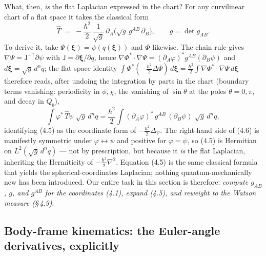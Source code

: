 What, then, \emph{is} the flat Laplacian expressed in the chart? For any curvilinear chart of a flat space it takes the classical form
\begin{equation}
\boxed{\;\hat T \;=\; -\frac{\hbar^{2}}{2}\,\frac{1}{\sqrt{g}}\,\partial_A\!\bigl(\sqrt{g}\,g^{AB}\,\partial_B\bigr),\qquad g=\det g_{AB}.\;} \tag{4.5}
\end{equation}
To derive it, take $\Psi(\boldsymbol\xi)=\psi(q(\boldsymbol\xi))$ and $\Phi$ likewise. The chain rule gives $\nabla\Psi=\mathsf J^{-\mathsf T}\partial\psi$ with $\mathsf J=\partial\boldsymbol\xi/\partial q$, hence $\nabla\Phi^{*}\!\cdot\!\nabla\Psi=(\partial_A\varphi)^{*}g^{AB}(\partial_B\psi)$ and $d\boldsymbol\xi=\sqrt g\,d^nq$; the flat-space identity $\int\Phi^{*}(-\tfrac{\hbar^2}{2}\Delta\Psi)\,d\boldsymbol\xi=\tfrac{\hbar^2}{2}\int\nabla\Phi^{*}\!\cdot\!\nabla\Psi\,d\boldsymbol\xi$ therefore reads, after undoing the integration by parts in the chart (boundary terms vanishing: periodicity in $\phi,\chi$, the vanishing of $\sin\theta$ at the poles $\theta=0,\pi$, and decay in $Q_b$),
\begin{equation}
\int\varphi^{*}\,\hat T\psi\;\sqrt{g}\,d^{n}q
=\frac{\hbar^{2}}{2}\int (\partial_A\varphi)^{*}\,g^{AB}\,(\partial_B\psi)\;\sqrt{g}\,d^{n}q , \tag{4.6}
\end{equation}
identifying (4.5) as the coordinate form of $-\tfrac{\hbar^2}{2}\Delta_{\mathcal V}$. The right-hand side of (4.6) is manifestly symmetric under $\varphi\leftrightarrow\psi$ and positive for $\varphi=\psi$, so (4.5) is Hermitian on $L^{2}(\sqrt g\,d^nq)$ --- not by prescription, but because it \emph{is} the flat Laplacian, inheriting the Hermiticity of $-\tfrac{\hbar^2}{2}\nabla^{2}$. Equation (4.5) is the same classical formula that yields the spherical-coordinates Laplacian; nothing quantum-mechanically new has been introduced. Our entire task in this section is therefore: \emph{compute $g_{AB}$, $g$, and $g^{AB}$ for the coordinates (4.1), expand (4.5), and reweight to the Watson measure (\S\,4.9)}.

\subsection{Body-frame kinematics: the Euler-angle derivatives, explicitly}

